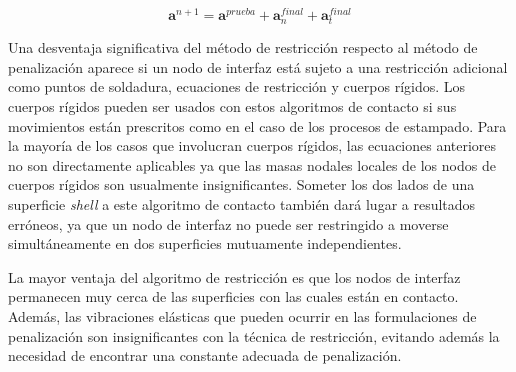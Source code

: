 $$
\mathbf{a}^{n+1} = \mathbf{a}^{prueba}  +  \mathbf{a}_n^{final} + \mathbf{a}_t^{final}
$$

Una desventaja significativa del método de restricción respecto al método de penalización 
aparece si un nodo de interfaz está sujeto a una restricción adicional como puntos de 
soldadura, ecuaciones de restricción y cuerpos rígidos. Los cuerpos rígidos pueden 
ser usados con estos algoritmos de contacto si sus movimientos están prescritos como 
en el caso de los procesos de estampado. Para la mayoría de los casos que involucran 
cuerpos rígidos, las ecuaciones anteriores no son directamente aplicables ya que las 
masas nodales locales de los nodos de cuerpos rígidos son usualmente insignificantes. 
Someter los dos lados de una superficie \textit{shell} a este algoritmo de contacto 
también dará lugar a resultados erróneos, ya que un nodo de interfaz no puede 
ser restringido a moverse simultáneamente en dos superficies mutuamente independientes.

La mayor ventaja del algoritmo de restricción es que los nodos de interfaz permanecen 
muy cerca de las superficies con las cuales están en contacto. Además, las vibraciones 
elásticas que pueden ocurrir en las formulaciones de penalización son insignificantes 
con la técnica de restricción, evitando además la necesidad de encontrar una constante 
adecuada de penalización.




